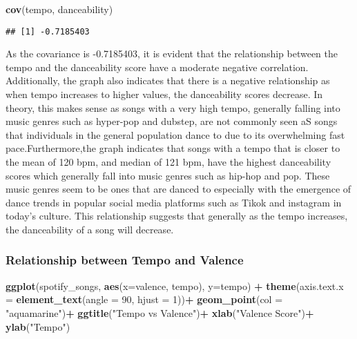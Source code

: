 \documentclass[
]{article}
\newenvironment{Shaded}{\begin{snugshade}}{\end{snugshade}}
\newcommand{\DataTypeTok}[1]{\textcolor[rgb]{0.13,0.29,0.53}{#1}}
\newcommand{\DecValTok}[1]{\textcolor[rgb]{0.00,0.00,0.81}{#1}}
\newcommand{\KeywordTok}[1]{\textcolor[rgb]{0.13,0.29,0.53}{\textbf{#1}}}
\newcommand{\NormalTok}[1]{#1}
\newcommand{\OperatorTok}[1]{\textcolor[rgb]{0.81,0.36,0.00}{\textbf{#1}}}
\newcommand{\StringTok}[1]{\textcolor[rgb]{0.31,0.60,0.02}{#1}}
\begin{document}
\begin{Shaded}
\begin{Highlighting}[]
\KeywordTok{cov}\NormalTok{(tempo, danceability)}
\end{Highlighting}
\end{Shaded}

\begin{verbatim}
## [1] -0.7185403
\end{verbatim}

As the covariance is -0.7185403, it is evident that the relationship
between the tempo and the danceability score have a moderate negative
correlation. Additionally, the graph also indicates that there is a
negative relationship as when tempo increases to higher values, the
danceability scores decrease. In theory, this makes sense as songs with
a very high tempo, generally falling into music genres such as hyper-pop
and dubstep, are not commonly seen aS songs that individuals in the
general population dance to due to its overwhelming fast
pace.Furthermore,the graph indicates that songs with a tempo that is
closer to the mean of 120 bpm, and median of 121 bpm, have the highest
danceability scores which generally fall into music genres such as
hip-hop and pop. These music genres seem to be ones that are danced to
especially with the emergence of dance trends in popular social media
platforms such as Tikok and instagram in today's culture. This
relationship suggests that generally as the tempo increases, the
danceability of a song will decrease.

\hypertarget{relationship-between-tempo-and-valence}{%
\subsubsection{Relationship between Tempo and
Valence}\label{relationship-between-tempo-and-valence}}

\begin{Shaded}
\begin{Highlighting}[]
\KeywordTok{ggplot}\NormalTok{(spotify_songs, }\KeywordTok{aes}\NormalTok{(}\DataTypeTok{x=}\NormalTok{valence,}
\NormalTok{                          tempo), }\DataTypeTok{y=}\NormalTok{tempo) }\OperatorTok{+}\StringTok{  }
\StringTok{  }\KeywordTok{theme}\NormalTok{(}\DataTypeTok{axis.text.x =} \KeywordTok{element_text}\NormalTok{(}\DataTypeTok{angle =} \DecValTok{90}\NormalTok{, }\DataTypeTok{hjust =} \DecValTok{1}\NormalTok{))}\OperatorTok{+}
\StringTok{  }\KeywordTok{geom_point}\NormalTok{(}\DataTypeTok{col =} \StringTok{"aquamarine"}\NormalTok{)}\OperatorTok{+}
\StringTok{  }\KeywordTok{ggtitle}\NormalTok{(}\StringTok{"Tempo vs Valence"}\NormalTok{)}\OperatorTok{+}
\StringTok{  }\KeywordTok{xlab}\NormalTok{(}\StringTok{"Valence Score"}\NormalTok{)}\OperatorTok{+}
\StringTok{  }\KeywordTok{ylab}\NormalTok{(}\StringTok{"Tempo"}\NormalTok{)}
\end{Highlighting}
\end{Shaded}
\end{document}
